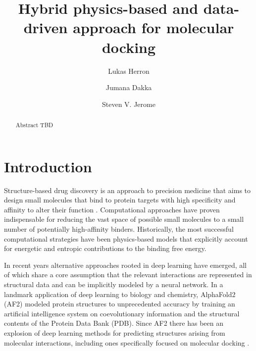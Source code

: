 \documentclass[%
 aip,
 amsmath,amssymb,
 reprint,%
]{revtex4-1}
\begin{document}
\title{Hybrid physics-based and data-driven approach for molecular docking}



\author{Lukas Herron}

\author{Jumana Dakka}
\author{Steven V. Jerome}



\begin{abstract}
Abstract TBD
\end{abstract}

\maketitle

\section{Introduction}

Structure-based drug discovery is an approach to precision medicine that aims to design small molecules that bind to protein targets with high specificity and affinity to alter their function \cite{drug-discovery-review}. Computational approaches have proven indispensable for reducing the vast space of possible small molecules to a small number of potentially high-affinity binders. Historically, the most successful computational strategies have been physics-based models that explicitly account for energetic\cite{trott2010autodock,verdonk2003gold,friesner2004glide} and entropic\cite{murphy2016wscore} contributions to the binding free energy. 

In recent years alternative approaches rooted in deep learning have emerged, all of which share a core assumption that the relevant interactions are represented in structural data and can be implicitly modeled by a neural network. In a landmark application of deep learning to biology and chemistry, AlphaFold2 (AF2) modeled protein structures to unprecedented accuracy by training an artificial intelligence system on coevolutionary information and the structural contents of the Protein Data Bank (PDB)\cite{jumper2021af2}. Since AF2 there has been an explosion of deep learning methods for predicting structures arising from molecular interactions\cite{krishna2024rfaa,abramson2024af3}, including ones specifically focused on molecular docking \cite{corso2022diffdock,qiao2024neuralplexer}. 
\end{document}
